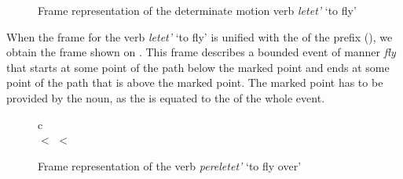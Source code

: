 \begin{figure}
\centering
{}
\caption{Frame representation of the determinate motion verb \textit{letet'} `to fly' \label{frame:letet}}
\end{figure}

When the frame for the verb \textit{letet'} `to fly' is unified with the  of the prefix  (), we obtain the frame shown on . This frame describes a bounded  event of manner \textit{fly} that starts at some point of the path below the marked point and ends at some point of the path that is above the marked point. The marked point has to be provided by the noun, as the  is equated to the  of the whole event. 

\begin{figure}
\begin{center}
\begin{tabular}{c}
\\
 $<$  $<$ 
\end{tabular}
\end{center}
\caption{Frame representation of the verb \textit{pereletet'} `to fly over' \label{frame:pere:letet}}
\end{figure}

